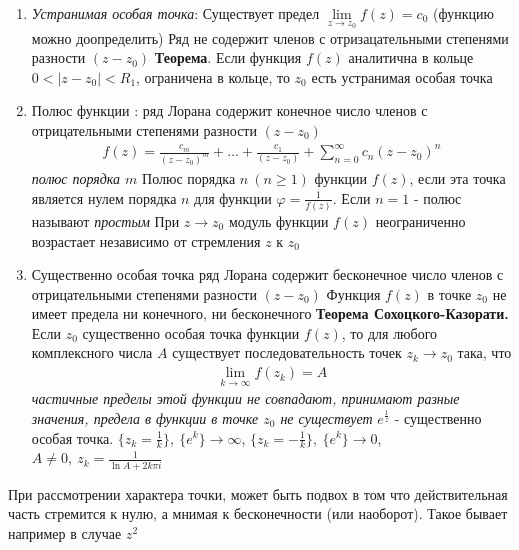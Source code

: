 \documentclass[12pt]{extarticle}
\begin{document}
\begin{enumerate}
    \item {}
        \textit{Устранимая особая точка}:
        \subitem Существует предел $\lim\limits_{z\rightarrow
        z_{0}}f(z)=c_{0}$ (функцию можно доопределить)
        \subitem Ряд не содержит членов с отризацательными степенями
        разности $(z-z_{0})$
        \subitem \textbf{Теорема}. Если функция $f(z)$ аналитична в кольце
        $0<|z-z_{0}|<R_{1}$, ограничена в кольце, то $z_{0}$ есть
        устранимая особая точка
    \item Полюс функции :
        \subitem ряд Лорана содержит конечное число членов с
        отрицательными степенями разности $(z-z_{0})$
        \begin{eqnarray*}
            f(z)=\frac{c_{m}}{(z-z_{0})^{m}}
            +\ldots+
            \frac{c_{1}}{(z-z_{0})}
            +\sum\limits_{n=0}^{\infty}c_{n}(z-z_{0})^{n}
        \end{eqnarray*}
        \textit{полюс порядка $m$}
        \subitem Полюс порядка $n\ (n\geqslant 1)$ функции $f(z)$, если
        эта точка является нулем порядка $n$ для функции
        $\varphi=\frac{1}{f(z)}$. Если $n=1$ - полюс называют
        \textit{простым}
        \subitem При $z\to z_{0}$ модуль функции $f(z)$ неограниченно
        возрастает независимо от стремления $z$ к $z_{0}$
    \item Существенно особая точка 
        \subitem ряд Лорана содержит бесконечное
        число членов с отрицательными степенями разности $(z-z_{0})$
        \subitem Функция $f(z)$ в точке $z_{0}$ не имеет предела ни
        конечного, ни бесконечного
        \subitem \textbf{Теорема Сохоцкого-Казорати.}
        Если $z_{0}$ существенно особая точка функции $f(z)$, то для
        любого комплексного числа $A$ существует последовательность
        точек $z_{k}\to z_{0}$ така, что
        \begin{eqnarray*}
            \lim\limits_{k\rightarrow \infty}f(z_{k})=A
        \end{eqnarray*}
        \textit{частичные пределы этой функции не совпадают, принимают
        разные значения, предела в функции в точке $z_{0}$ не существует}
        \subitem $e^{\frac{1}{z}}$ - существенно особая точка.
        $\{z_{k}=\frac{1}{k}\},\ \{e^{k}\}\to \infty$,
        $\{z_{k}=-\frac{1}{k}\},\ \{e^{k}\}\to 0$,
        $A\neq 0,\ z_{k}=\frac{1}{\ln{A}+2k\pi i}$
\end{enumerate}
При рассмотрении характера точки, может быть подвох в том что
действительная часть стремится к нулю, а мнимая к бесконечности (или
наоборот). Такое бывает например в случае $z^{2}$
\end{document}
